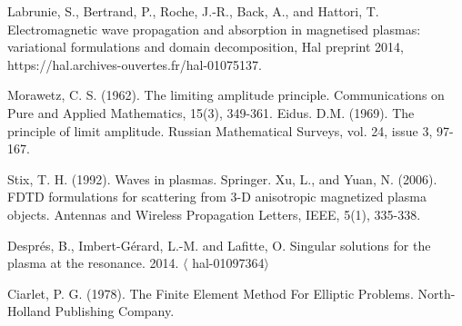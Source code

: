 \documentclass[proc]{edpsmath}
\begin{document}
\begin{thebibliography}{99}
Labrunie, S., Bertrand, P., Roche, J.-R., Back, A., and
Hattori, T. 
Electromagnetic wave propagation and absorption in
magnetised plasmas: variational formulations and
domain decomposition, Hal preprint 2014, https://hal.archives-ouvertes.fr/hal-01075137.




 Morawetz, C. S. (1962). The limiting amplitude principle. Communications on Pure and Applied Mathematics, 15(3), 349-361.
 Eidus. D.M. (1969). The principle of limit amplitude. Russian Mathematical Surveys, vol. 24, issue 3, 97-167.


 Stix, T. H. (1992). Waves in plasmas. Springer.
Xu, L., and Yuan, N. (2006). FDTD formulations for scattering from 3-D anisotropic magnetized plasma objects. Antennas and Wireless Propagation Letters, IEEE, 5(1), 335-338.

Despr\'es, B., Imbert-G\'erard, L.-M. and Lafitte, O. Singular solutions for the plasma at the resonance. 2014. $\langle$ hal-01097364$\rangle$


Ciarlet, P. G. (1978).  The Finite Element Method For Elliptic Problems. North-Holland Publishing Company.
\end{thebibliography}
\end{document}
